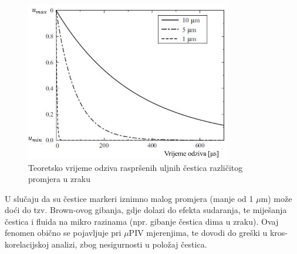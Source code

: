 \begin{description}[style=unboxed,leftmargin=0cm]
	\begin{figure}[h]  
		\centering
		\includegraphics[width=9cm]{./2_DPIV/2_3VrijemeOdzivaCestica.jpg} 
		\caption{Teoretsko vrijeme odziva raspršenih uljnih čestica različitog promjera u zraku \cite{raffel2018_book}}
		\label{sl:2.3}
	\end{figure}
	\item[Utjecaj Brown-ovog gibanja.] U slučaju da su čestice markeri iznimno malog promjera (manje od 1 $\mu$m) može doći do tzv. Brown-ovog gibanja, gdje dolazi do efekta sudaranja, te miješanja čestica i fluida na mikro razinama (npr. gibanje čestica dima u zraku). Ovaj fenomen obično se pojavljuje pri $\mu$PIV mjerenjima, te dovodi do greški u kros-korelacijskoj analizi, zbog nesigurnosti u položaj čestica.
\end{description}
\FloatBarrier
